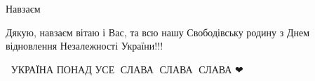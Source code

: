 \begin{itemize}
Навзаєм

 
Дякую, навзаєм вітаю і Вас, та всю нашу Свободівську родину з Днем відновлення Незалежності України!!!

 
💙💛УКРАЇНА ПОНАД УСЕ 🌻СЛАВА🌻 СЛАВА🌻 СЛАВА ❤


\end{itemize}

